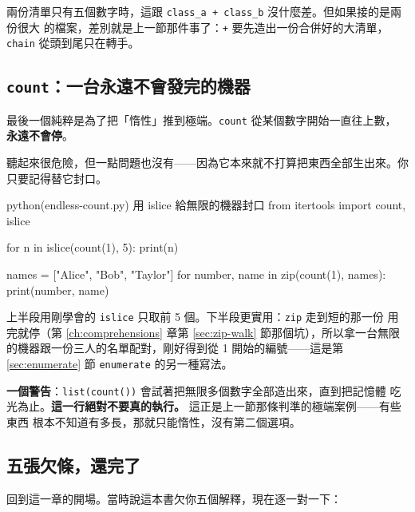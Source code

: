 兩份清單只有五個數字時，這跟 \texttt{class\_a + class\_b} 沒什麼差。但如果接的是兩份很大
的檔案，差別就是上一節那件事了：\texttt{+} 要先造出一份合併好的大清單，\texttt{chain}
從頭到尾只在轉手。

\subsection*{\texttt{count}：一台永遠不會發完的機器}

最後一個純粹是為了把「惰性」推到極端。\texttt{count} 從某個數字開始一直往上數，
\textbf{永遠不會停}。

聽起來很危險，但一點問題也沒有——因為它本來就不打算把東西全部生出來。你只要記得替它封口。

\begin{example}{python}{(endless-count.py) 用 islice 給無限的機器封口}
from itertools import count, islice

for n in islice(count(1), 5):
    print(n)

names = ["Alice", "Bob", "Taylor"]
for number, name in zip(count(1), names):
    print(number, name)
\end{example}


上半段用剛學會的 \texttt{islice} 只取前 5 個。下半段更實用：\texttt{zip} 走到短的那一份
用完就停（第 \ref{ch:comprehensions} 章第 \ref{sec:zip-walk} 節那個坑），所以拿一台無限
的機器跟一份三人的名單配對，剛好得到從 1 開始的編號——這是第 \ref{sec:enumerate} 節
\texttt{enumerate} 的另一種寫法。

\textbf{一個警告}：\texttt{list(count())} 會試著把無限多個數字全部造出來，直到把記憶體
吃光為止。\textbf{這一行絕對不要真的執行。} 這正是上一節那條判準的極端案例——有些東西
根本不知道有多長，那就只能惰性，沒有第二個選項。

\subsection*{五張欠條，還完了}

回到這一章的開場。當時說這本書欠你五個解釋，現在逐一對一下：

